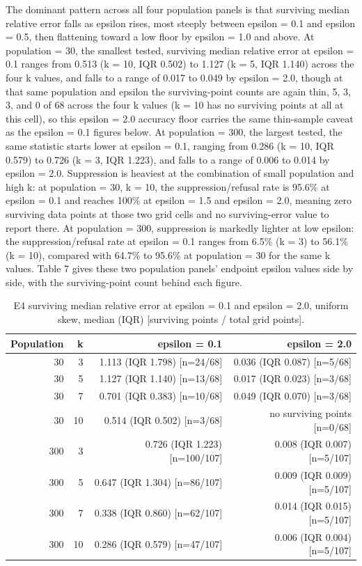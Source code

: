 The dominant pattern across all four population panels is that surviving median relative error falls as epsilon rises, most steeply between epsilon = 0.1 and epsilon = 0.5, then flattening toward a low floor by epsilon = 1.0 and above. At population = 30, the smallest tested, surviving median relative error at epsilon = 0.1 ranges from 0.513 (k = 10, IQR 0.502) to 1.127 (k = 5, IQR 1.140) across the four k values, and falls to a range of 0.017 to 0.049 by epsilon = 2.0, though at that same population and epsilon the surviving-point counts are again thin, 5, 3, 3, and 0 of 68 across the four k values (k = 10 has no surviving points at all at this cell), so this epsilon = 2.0 accuracy floor carries the same thin-sample caveat as the epsilon = 0.1 figures below. At population = 300, the largest tested, the same statistic starts lower at epsilon = 0.1, ranging from 0.286 (k = 10, IQR 0.579) to 0.726 (k = 3, IQR 1.223), and falls to a range of 0.006 to 0.014 by epsilon = 2.0. Suppression is heaviest at the combination of small population and high k: at population = 30, k = 10, the suppression/refusal rate is 95.6\% at epsilon = 0.1 and reaches 100\% at epsilon = 1.5 and epsilon = 2.0, meaning zero surviving data points at those two grid cells and no surviving-error value to report there. At population = 300, suppression is markedly lighter at low epsilon: the suppression/refusal rate at epsilon = 0.1 ranges from 6.5\% (k = 3) to 56.1\% (k = 10), compared with 64.7\% to 95.6\% at population = 30 for the same k values. Table 7 gives these two population panels' endpoint epsilon values side by side, with the surviving-point count behind each figure.

\begin{table}[H]
\caption{E4 surviving median relative error at epsilon = 0.1 and epsilon = 2.0, uniform skew, median (IQR) [surviving points / total grid points].\label{tab:t7}}
\small
\begin{tabular}{rrrr}
\toprule
Population & k & epsilon = 0.1 & epsilon = 2.0 \\
\midrule
30 & 3 & 1.113 (IQR 1.798) [n=24/68] & 0.036 (IQR 0.087) [n=5/68] \\
30 & 5 & 1.127 (IQR 1.140) [n=13/68] & 0.017 (IQR 0.023) [n=3/68] \\
30 & 7 & 0.701 (IQR 0.383) [n=10/68] & 0.049 (IQR 0.070) [n=3/68] \\
30 & 10 & 0.514 (IQR 0.502) [n=3/68] & no surviving points [n=0/68] \\
300 & 3 & 0.726 (IQR 1.223) [n=100/107] & 0.008 (IQR 0.007) [n=5/107] \\
300 & 5 & 0.647 (IQR 1.304) [n=86/107] & 0.009 (IQR 0.009) [n=5/107] \\
300 & 7 & 0.338 (IQR 0.860) [n=62/107] & 0.014 (IQR 0.015) [n=5/107] \\
300 & 10 & 0.286 (IQR 0.579) [n=47/107] & 0.006 (IQR 0.004) [n=5/107] \\
\bottomrule
\end{tabular}
\end{table}

